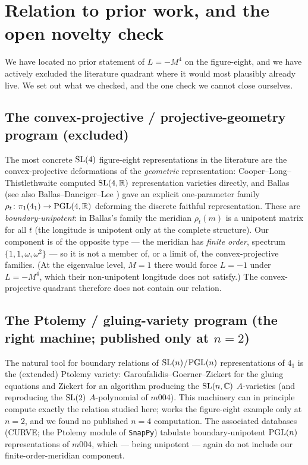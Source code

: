 \section{Relation to prior work, and the open novelty check}
\label{sec:novelty}

We have located no prior statement of $L=-M^4$ on the figure-eight, and we have actively excluded the
literature quadrant where it would most plausibly already live. We set out what we checked, and the one
check we cannot close ourselves.

\subsection{The convex-projective / projective-geometry program (excluded)} The most concrete $\mathrm{SL}(4)$
figure-eight representations in the literature are the convex-projective deformations of the
\emph{geometric} representation: Cooper--Long--Thistlethwaite \cite{cooperlongthistlethwaite2006} computed
$\mathrm{SL}(4,\mathbb{R})$ representation varieties directly, and Ballas \cite{ballas2015} (see also
Ballas--Danciger--Lee \cite{ballasdancigerlee2018}) gave an explicit one-parameter family
$\rho_t\colon\pi_1(4_1)\to\mathrm{PGL}(4,\mathbb{R})$ deforming the discrete faithful representation. These are
\emph{boundary-unipotent}: in Ballas's family the meridian $\rho_t(m)$ is a unipotent matrix for all $t$
(the longitude is unipotent only at the complete structure). Our component is of the opposite type --- the
meridian has \emph{finite order}, spectrum $\{1,1,\omega,\omega^2\}$ --- so it is not a member of, or a
limit of, the convex-projective families. (At the eigenvalue level, $M=1$ there would force $L=-1$ under
$L=-M^4$, which their non-unipotent longitude does not satisfy.) The convex-projective quadrant therefore
does not contain our relation.

\subsection{The Ptolemy / gluing-variety program (the right machine; published only at $n=2$)} The natural
tool for boundary relations of $\mathrm{SL}(n)$/$\mathrm{PGL}(n)$ representations of $4_1$ is the (extended) Ptolemy
variety: Garoufalidis--Goerner--Zickert \cite{ggz2015} for the gluing equations and Zickert
\cite{zickert2016} for an algorithm producing the $\mathrm{SL}(n,\mathbb{C})$ $A$-varieties (and reproducing the $\mathrm{SL}(2)$
$A$-polynomial of $m004$). This machinery can in principle compute exactly the relation studied here;
\cite{zickert2016} works the figure-eight example only at $n=2$, and we found no published $n=4$
computation. The associated databases (CURVE; the Ptolemy module of \texttt{SnapPy}) tabulate
boundary-unipotent $\mathrm{PGL}(n)$ representations of $m004$, which --- being unipotent --- again do not include
our finite-order-meridian component.

